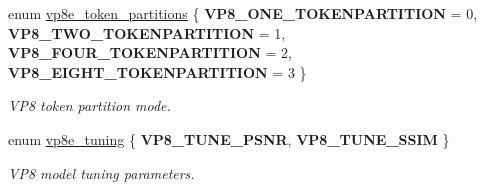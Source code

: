 \begin{DoxyCompactItemize}
enum \hyperlink{group__vp8__encoder_ga5f7508ba3fb453b47f62313ed0b864d2}{vp8e\-\_\-token\-\_\-partitions} \{ {\bfseries \-V\-P8\-\_\-\-O\-N\-E\-\_\-\-T\-O\-K\-E\-N\-P\-A\-R\-T\-I\-T\-I\-O\-N} =  0, 
{\bfseries \-V\-P8\-\_\-\-T\-W\-O\-\_\-\-T\-O\-K\-E\-N\-P\-A\-R\-T\-I\-T\-I\-O\-N} =  1, 
{\bfseries \-V\-P8\-\_\-\-F\-O\-U\-R\-\_\-\-T\-O\-K\-E\-N\-P\-A\-R\-T\-I\-T\-I\-O\-N} =  2, 
{\bfseries \-V\-P8\-\_\-\-E\-I\-G\-H\-T\-\_\-\-T\-O\-K\-E\-N\-P\-A\-R\-T\-I\-T\-I\-O\-N} =  3
 \}
\begin{DoxyCompactList}\small\item\em \-V\-P8 token partition mode. \end{DoxyCompactList}\item 
enum \hyperlink{group__vp8__encoder_ga371dbc29054b3d46364af996ad42ab94}{vp8e\-\_\-tuning} \{ {\bfseries \-V\-P8\-\_\-\-T\-U\-N\-E\-\_\-\-P\-S\-N\-R}, 
{\bfseries \-V\-P8\-\_\-\-T\-U\-N\-E\-\_\-\-S\-S\-I\-M}
 \}
\begin{DoxyCompactList}\small\item\em \-V\-P8 model tuning parameters. \end{DoxyCompactList}\end{DoxyCompactItemize}
